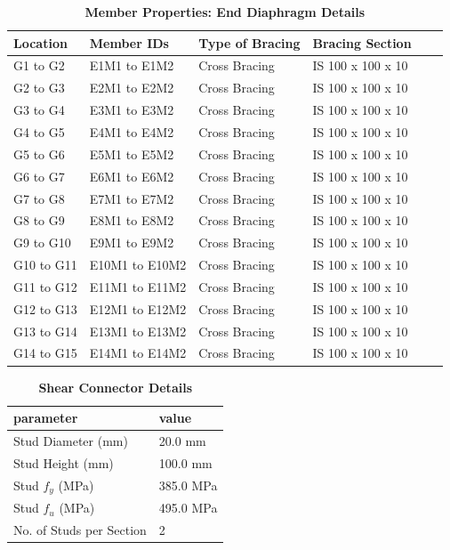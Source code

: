 \documentclass[12pt,a4paper]{report}
\numberwithin{table}{chapter}
\numberwithin{figure}{chapter}
\begin{document}
\begin{longtable}{|L{2.2cm}|L{2.2cm}|L{3.0cm}|L{2.5cm}|C{1.8cm}|C{1.8cm}|}
\caption{\textbf{Member Properties: End Diaphragm Details}}
\hline
\textbf{Location} & \textbf{Member IDs} & \textbf{Type of Bracing} & \textbf{Bracing Section} \\
\hline
G1 to G2 & E1M1 to E1M2 & Cross Bracing & IS 100 x 100 x 10 \\[6pt]
\hline
G2 to G3 & E2M1 to E2M2 & Cross Bracing & IS 100 x 100 x 10 \\[6pt]
\hline
G3 to G4 & E3M1 to E3M2 & Cross Bracing & IS 100 x 100 x 10 \\[6pt]
\hline
G4 to G5 & E4M1 to E4M2 & Cross Bracing & IS 100 x 100 x 10 \\[6pt]
\hline
G5 to G6 & E5M1 to E5M2 & Cross Bracing & IS 100 x 100 x 10 \\[6pt]
\hline
G6 to G7 & E6M1 to E6M2 & Cross Bracing & IS 100 x 100 x 10 \\[6pt]
\hline
G7 to G8 & E7M1 to E7M2 & Cross Bracing & IS 100 x 100 x 10 \\[6pt]
\hline
G8 to G9 & E8M1 to E8M2 & Cross Bracing & IS 100 x 100 x 10 \\[6pt]
\hline
G9 to G10 & E9M1 to E9M2 & Cross Bracing & IS 100 x 100 x 10 \\[6pt]
\hline
G10 to G11 & E10M1 to E10M2 & Cross Bracing & IS 100 x 100 x 10 \\[6pt]
\hline
G11 to G12 & E11M1 to E11M2 & Cross Bracing & IS 100 x 100 x 10 \\[6pt]
\hline
G12 to G13 & E12M1 to E12M2 & Cross Bracing & IS 100 x 100 x 10 \\[6pt]
\hline
G13 to G14 & E13M1 to E13M2 & Cross Bracing & IS 100 x 100 x 10 \\[6pt]
\hline
G14 to G15 & E14M1 to E14M2 & Cross Bracing & IS 100 x 100 x 10 \\[6pt]
\hline
\end{longtable}



\label{subsec:shear-connectors}

\vspace{2.2em}

\vspace{0.4em}
\begin{longtable}{|L{5.5cm}|p{10.0cm}|}
\caption{\textbf{Shear Connector Details}}
\hline
\textbf{parameter} & \textbf{value} \\
\hline
\textnormal{Stud Diameter (mm)} & 20.0 mm \\[6pt]
\hline
\textnormal{Stud Height (mm)} & 100.0 mm \\[6pt]
\hline
\textnormal{Stud $f_y$ (MPa)} & 385.0 MPa \\[6pt]
\hline
\textnormal{Stud $f_u$ (MPa)} & 495.0 MPa \\[6pt]
\hline
\textnormal{No. of Studs per Section} & 2 \\[6pt]
\hline
\end{longtable}
\end{document}
